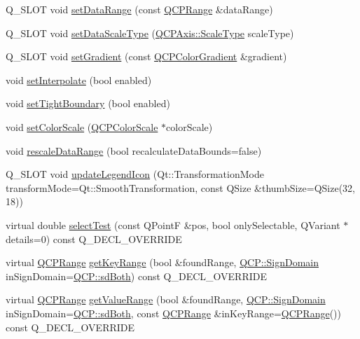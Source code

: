 \begin{DoxyCompactItemize}
\item 
Q\+\_\+\+S\+L\+OT void \mbox{\hyperlink{class_q_c_p_color_map_a980b42837821159786a85b4b7dcb8774}{set\+Data\+Range}} (const \mbox{\hyperlink{class_q_c_p_range}{Q\+C\+P\+Range}} \&data\+Range)
\item 
Q\+\_\+\+S\+L\+OT void \mbox{\hyperlink{class_q_c_p_color_map_a9d20aa08e3c1f20f22908c45b9c06511}{set\+Data\+Scale\+Type}} (\mbox{\hyperlink{class_q_c_p_axis_a36d8e8658dbaa179bf2aeb973db2d6f0}{Q\+C\+P\+Axis\+::\+Scale\+Type}} scale\+Type)
\item 
Q\+\_\+\+S\+L\+OT void \mbox{\hyperlink{class_q_c_p_color_map_a7313c78360471cead3576341a2c50377}{set\+Gradient}} (const \mbox{\hyperlink{class_q_c_p_color_gradient}{Q\+C\+P\+Color\+Gradient}} \&gradient)
\item 
void \mbox{\hyperlink{class_q_c_p_color_map_a484eaa8a5065cfc386b15375bf98b964}{set\+Interpolate}} (bool enabled)
\item 
void \mbox{\hyperlink{class_q_c_p_color_map_ad03221cc285e5f562a0b13d684b5576d}{set\+Tight\+Boundary}} (bool enabled)
\item 
void \mbox{\hyperlink{class_q_c_p_color_map_aa828921db364fe3c6af4619580ab85fd}{set\+Color\+Scale}} (\mbox{\hyperlink{class_q_c_p_color_scale}{Q\+C\+P\+Color\+Scale}} $\ast$color\+Scale)
\item 
void \mbox{\hyperlink{class_q_c_p_color_map_a856608fa3dd1cc290bcd5f29a5575774}{rescale\+Data\+Range}} (bool recalculate\+Data\+Bounds=false)
\item 
Q\+\_\+\+S\+L\+OT void \mbox{\hyperlink{class_q_c_p_color_map_a5d8158b62d55fcfeaabcb68ce0083e87}{update\+Legend\+Icon}} (Qt\+::\+Transformation\+Mode transform\+Mode=Qt\+::\+Smooth\+Transformation, const Q\+Size \&thumb\+Size=Q\+Size(32, 18))
\item 
virtual double \mbox{\hyperlink{class_q_c_p_color_map_afb4b843596addf58096082827a9e3450}{select\+Test}} (const Q\+PointF \&pos, bool only\+Selectable, Q\+Variant $\ast$details=0) const Q\+\_\+\+D\+E\+C\+L\+\_\+\+O\+V\+E\+R\+R\+I\+DE
\item 
virtual \mbox{\hyperlink{class_q_c_p_range}{Q\+C\+P\+Range}} \mbox{\hyperlink{class_q_c_p_color_map_a985861974560f950af6cb7fae8c46267}{get\+Key\+Range}} (bool \&found\+Range, \mbox{\hyperlink{namespace_q_c_p_afd50e7cf431af385614987d8553ff8a9}{Q\+C\+P\+::\+Sign\+Domain}} in\+Sign\+Domain=\mbox{\hyperlink{namespace_q_c_p_afd50e7cf431af385614987d8553ff8a9aa38352ef02d51ddfa4399d9551566e24}{Q\+C\+P\+::sd\+Both}}) const Q\+\_\+\+D\+E\+C\+L\+\_\+\+O\+V\+E\+R\+R\+I\+DE
\item 
virtual \mbox{\hyperlink{class_q_c_p_range}{Q\+C\+P\+Range}} \mbox{\hyperlink{class_q_c_p_color_map_a88134493aaf6b297af34eaab65264fff}{get\+Value\+Range}} (bool \&found\+Range, \mbox{\hyperlink{namespace_q_c_p_afd50e7cf431af385614987d8553ff8a9}{Q\+C\+P\+::\+Sign\+Domain}} in\+Sign\+Domain=\mbox{\hyperlink{namespace_q_c_p_afd50e7cf431af385614987d8553ff8a9aa38352ef02d51ddfa4399d9551566e24}{Q\+C\+P\+::sd\+Both}}, const \mbox{\hyperlink{class_q_c_p_range}{Q\+C\+P\+Range}} \&in\+Key\+Range=\mbox{\hyperlink{class_q_c_p_range}{Q\+C\+P\+Range}}()) const Q\+\_\+\+D\+E\+C\+L\+\_\+\+O\+V\+E\+R\+R\+I\+DE
\end{DoxyCompactItemize}
